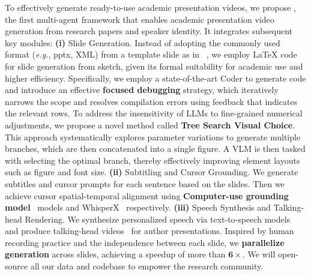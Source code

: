 \vspace{-0.2\baselineskip} 
To effectively generate ready-to-use academic presentation videos, we propose \textbf{\agent}, the first multi-agent framework that enables academic presentation video generation from research papers and speaker identity. It integrates subsequent key modules: \textbf{(i)} Slide Generation. Instead of adopting the commonly used format (\textit{e.g.}, pptx, XML) from a template slide as in ~\cite{zheng2025pptagent}, we employ LaTeX code for slide generation from sketch, given its formal suitability for academic use and higher efficiency. Specifically, we employ a state-of-the-art Coder to generate code and introduce an effective \textbf{focused debugging} strategy, which iteratively narrows the scope and resolves compilation errors using feedback that indicates the relevant rows.
To address the insensitivity of LLMs to fine-grained numerical adjustments, we propose a novel method called \textbf{Tree Search Visual Choice}. This approach systematically explores parameter variations to generate multiple branches, which are then concatenated into a single figure. A VLM is then tasked with selecting the optimal branch, thereby effectively improving element layouts such as figure and font size.
\textbf{(ii)} Subtitling and Cursor Grounding. We generate subtitles and cursor prompts for each sentence based on the slides. Then we achieve cursor spatial-temporal alignment using \textbf{Computer-use grounding model}~\cite{lin2025showui, qin2025ui} models and WhisperX~\cite{bain2023whisperx} respectively. \textbf{(iii)} Speech Synthesis and Talking-head Rendering. We synthesize personalized speech via text-to-speech models~\cite{chen2024f5} and produce talking-head videos~\cite{cui2024hallo2,fantasytalking} for author presentations. Inspired by human recording practice and the independence between each slide, we \textbf{parallelize generation} across slides, achieving a speedup of more than $\mathbf{6\times}$.
We will open-source all our data and codebase to empower the research community.

